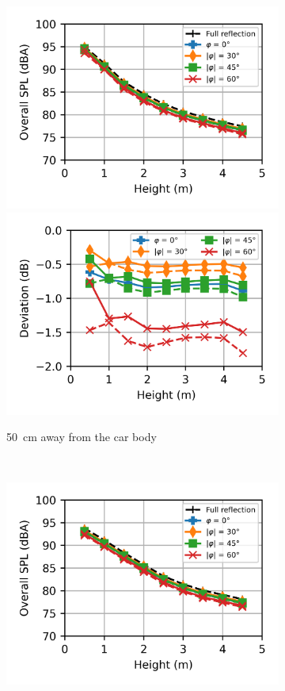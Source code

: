 \begin{figure}
\begin{subfigure}[b]{\textwidth}
		\includegraphics{fig/chap5/impedance/overall_SPL/overall_SPL_pos_f.png}
		\includegraphics{fig/chap5/impedance/overall_SPL/deviation_pos_f.png}
		\caption{\SI{50}{\centi\meter} away from the car body}
	\end{subfigure}
	\\
	\begin{subfigure}[b]{\textwidth}
		\centering
		\includegraphics{fig/chap5/impedance/overall_SPL/overall_SPL_pos_g.png}

\end{subfigure}
\end{figure}

